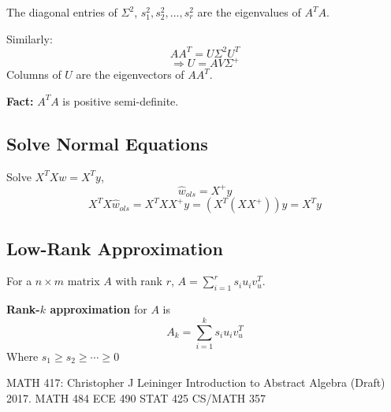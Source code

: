 \documentclass[11pt]{elegantbook}
\begin{document}
The diagonal entries of $\Sigma^2$, $s_1^2,s_2^2,...,s_r^2$ are the eigenvalues of $A^TA$.

Similarly: $$AA^T=U\Sigma^2U^T$$
$$\Rightarrow U=AV\Sigma^+$$
Columns of $U$ are the eigenvectors of $AA^T$.

\textbf{Fact:} $A^TA$ is positive semi-definite.

\subsection{Solve Normal Equations}
Solve $X^TXw=X^Ty$, $$\hat{w}_{ols}=X^+y$$
$$X^TX\hat{w}_{ols}=X^TXX^+y=(X^T(XX^+))y=X^Ty$$

\subsection{Low-Rank Approximation}
For a $n\times m$ matrix $A$ with rank $r$, $A=\sum_{i=1}^rs_iu_iv_u^T$.

\textbf{Rank-$k$ approximation} for $A$ is
$$A_k=\sum_{i=1}^ks_iu_iv_u^T$$
Where $s_1\geq s_2\geq \cdots\geq 0$




\begin{thebibliography}{1}
      MATH 417: Christopher J Leininger  \newblock Introduction to Abstract Algebra (Draft)  2017.
     MATH 484
     ECE 490
     STAT 425
     CS/MATH 357
\end{thebibliography}
\end{document}
